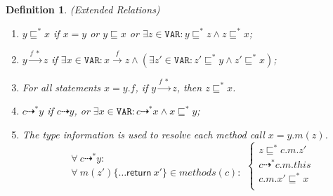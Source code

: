 \documentclass{fac}
\newcommand\eg{\textit{e.g.\ }}
\newtheorem{Definition}{Definition}
\newcommand{\keyword}[1]{\mathsf{#1}}
\newcommand{\kw}[1]{\keyword{#1}}
\newcommand\Var{\mathtt{VAR}}
\newcommand{\less}{\sqsubseteq}
\newcommand{\tflow}{\dashrightarrow}
\newcommand{\hflow}{\longrightarrow}
\newcommand{\lhflow}[1]{\stackrel{#1}{\hflow}}
\begin{document}
\begin{Definition}\label{def:extension} (Extended Relations)
\begin{enumerate}
\item $y\less^* x$ if $x=y$ or $y\less x$ or $\exists z\in\Var:y\less^* z\wedge z\less^* x$;


\item $y\lhflow{f\ *}z$ if $\exists x\in\Var: x\lhflow{f}z\wedge (\exists z'\in\Var: z'\less^* y \wedge z'\less^*x)$;


\item For all statements $x = y.f $, if $y\lhflow{f\ *}z$, then $z\less^* x$.


\item $c\tflow^* y$ if $c\tflow y$, or $\exists x\in\Var:c\tflow^* x\wedge x\less^* y$;


\item The type information is used to resolve each method call $x = y.m(z)$.
  \begin{equation*}
  \left.\begin{array}{l}\forall\ c\tflow^* y:\\ \forall\ m(z')\{\dots \kw{return}\ x'\}\in methods(c):\end{array}\right.\left\{\begin{array}{l}
        z\less^* c.m.z'\\
        c\tflow^* c.m.this\\
        c.m.x'\less^* x \\
        \end{array}\right.
  \end{equation*}
\end{enumerate}
\end{Definition}
\end{document}
